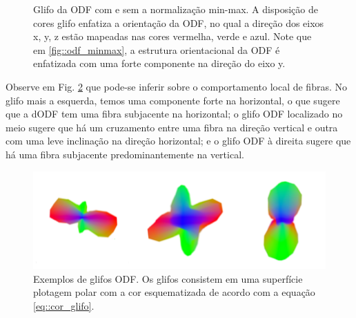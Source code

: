 \documentclass[
    12pt,                %
    oneside,            %
    a4paper,            %
    english,            %
    french,                %
    spanish,            %
    brazil                %
    ]{abntex2}
\begin{document}
\begin{figure}[ht]
\centering
\captionsetup[subfloat]{farskip=0pt,nearskip=0pt}
\centering
    \hspace{1em}
     \caption{Glifo da ODF com e sem a normalização min-max. A disposição de cores glifo enfatiza a orientação da ODF, no qual a direção dos eixos x, y, z estão mapeadas nas cores vermelha, verde e azul. Note que em \ref{fig::odf_minmax}, a estrutura orientacional da ODF é enfatizada com uma forte componente na direção do eixo y. %
     }
    \label{fig::normalizacao_min_max}
\end{figure}

Observe em Fig. \ref{fig::glifo_ilustrado} que pode-se inferir sobre o comportamento local de fibras. No glifo mais a esquerda, temos uma componente forte na horizontal, o que sugere que a dODF tem uma fibra subjacente na horizontal; o glifo ODF localizado no meio sugere que há um cruzamento entre uma fibra na direção vertical e outra com uma leve inclinação na direção horizontal; e o glifo ODF à direita sugere que há uma fibra subjacente predominantemente na vertical.



\begin{figure}[ht]

    \centering
    \includegraphics[width=.8\linewidth, angle=0]{figs/Esquema_Glifo/Glifos3Ex.png}
    \caption{Exemplos de glifos ODF. Os glifos consistem em uma superfície plotagem polar com a cor esquematizada de acordo com a equação \ref{eq::cor_glifo}.}
    \label{fig::glifo_ilustrado}
   \hspace{1pt}
\end{figure}
\end{document}
